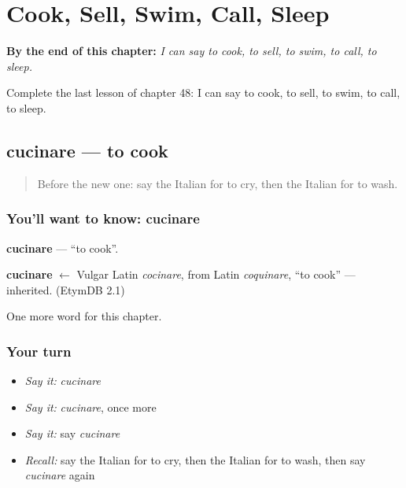 
\chapter{Cook, Sell, Swim, Call, Sleep}
\label{ch:it-cook-sell-swim-call-sleep}

\begin{chapteropening}
\textbf{By the end of this chapter:} \emph{I can say to cook, to sell, to swim, to call, to sleep.}

Complete the last lesson of chapter 48: I can say to cook, to sell, to swim, to call, to sleep.
\end{chapteropening}

\section[cucinare]{cucinare — to cook}

\label{lesson:IT-C48-cucinare}



\begin{quote}
Before the new one: say the Italian for to cry, then the Italian for to wash.
\end{quote}

\subsection*{You'll want to know: cucinare}
\textbf{cucinare} — \textquotedblleft{}to cook\textquotedblright{}.

\begin{cousinweb}
\textbf{cucinare} $\leftarrow$ Vulgar Latin \emph{cocinare}, from Latin \emph{coquinare}, \textquotedblleft{}to cook\textquotedblright{} — inherited. (EtymDB 2.1)
\end{cousinweb}

\begin{grammarlens}[title={What you've built}]
One more word for this chapter.
\end{grammarlens}

\subsection*{Your turn}
\begin{itemize}
\raggedright
  \item \emph{Say it:} \emph{cucinare}
  \item \emph{Say it:} \emph{cucinare}, once more
  \item \emph{Say it:} say \emph{cucinare}
  \item \emph{Recall:} say the Italian for to cry, then the Italian for to wash, then say \emph{cucinare} again
\end{itemize}

